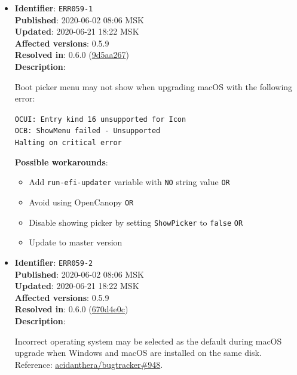 \documentclass[]{article}
\providecommand{\tightlist}{%
  \setlength{\itemsep}{0pt}\setlength{\parskip}{0pt}}
\begin{document}
\begin{itemize}
\item
  \textbf{Identifier}: \texttt{ERR059-1} \\
  \textbf{Published}: 2020-06-02 08:06 MSK \\
  \textbf{Updated}: 2020-06-21 18:22 MSK \\
  \textbf{Affected versions}: 0.5.9 \\
  \textbf{Resolved in}: 0.6.0 (\href{https://github.com/acidanthera/MaxRegnerPkg/commit/9d5aa267a9133fd9390b62012c21428fc77681f2}{9d5aa267}) \\
  \textbf{Description}:

  Boot picker menu may not show when upgrading macOS with the following error:

\texttt{OCUI﻿: Ent﻿ry kind 16 unsupported for Icon﻿}\\
\texttt{OCB: ShowMenu failed - Unsupported﻿﻿}\\
\texttt{Halting on critical error﻿}

  \textbf{Possible workarounds}:
  \begin{itemize}
    \tightlist
    \item Add \texttt{run-efi-updater} variable with \texttt{NO} string value \texttt{OR}
    \item Avoid using OpenCanopy \texttt{OR}
    \item Disable showing picker by setting \texttt{ShowPicker} to \texttt{false} \texttt{OR}
    \item Update to master version
  \end{itemize}


\item
  \textbf{Identifier}: \texttt{ERR059-2} \\
  \textbf{Published}: 2020-06-02 08:06 MSK \\
  \textbf{Updated}: 2020-06-21 18:22 MSK \\
  \textbf{Affected versions}: 0.5.9 \\
  \textbf{Resolved in}: 0.6.0 (\href{https://github.com/acidanthera/MaxRegnerPkg/commit/670d4e0c4f8538268367d16fc3ddef9b2ed13d46}{670d4e0c}) \\
  \textbf{Description}:

  Incorrect operating system may be selected as the default during macOS upgrade when
  Windows and macOS are installed on the same disk. Reference:
  \href{https://github.com/acidanthera/bugtracker/issues/948}{acidanthera/bugtracker\#948}.


\end{itemize}
\end{document}
